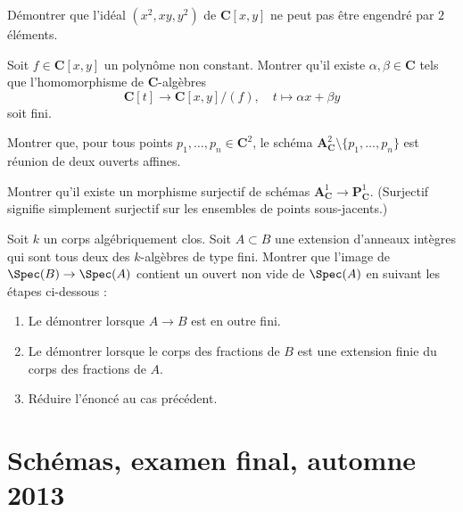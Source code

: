 \begin{exercise}
\label{exercise-not-complete-intersection}
Démontrer que l'idéal $(x^2, xy, y^2)$ de $\mathbf{C}[x, y]$
ne peut pas être engendré par $2$ éléments.
\end{exercise}

\begin{exercise}
\label{exercise-finite-projection}
Soit $f \in \mathbf{C}[x, y]$ un polynôme non constant.
Montrer qu'il existe $\alpha, \beta \in \mathbf{C}$ tels que
l'homomorphisme de $\mathbf{C}$-algèbres
$$
\mathbf{C}[t] \longrightarrow \mathbf{C}[x, y]/(f),\quad
t \longmapsto \alpha x + \beta y
$$
soit fini.
\end{exercise}

\begin{exercise}
\label{exercise-union-of-two-affines}
Montrer que, pour tous points $p_1, \ldots, p_n \in \mathbf{C}^2$,
le schéma $\mathbf{A}^2_\mathbf{C} \setminus \{p_1, \ldots, p_n\}$
est réunion de deux ouverts affines.
\end{exercise}

\begin{exercise}
\label{exercise-surjection-A1-P1}
Montrer qu'il existe un morphisme surjectif de schémas
$\mathbf{A}^1_\mathbf{C} \to \mathbf{P}^1_\mathbf{C}$.
(Surjectif signifie simplement surjectif sur les ensembles de points sous-jacents.)
\end{exercise}

\begin{exercise}
\label{exercise-almost-surjective}
Soit $k$ un corps algébriquement clos. Soit $A \subset B$ une extension
d'anneaux intègres qui sont tous deux des $k$-algèbres de type fini.
Montrer que l'image de $\Spec(B) \to \Spec(A)$
contient un ouvert non vide de $\Spec(A)$ en suivant les étapes ci-dessous :
\begin{enumerate}
\item Le démontrer lorsque $A \to B$ est en outre fini.
\item Le démontrer lorsque le corps des fractions de $B$ est une extension finie
du corps des fractions de $A$.
\item Réduire l'énoncé au cas précédent.
\end{enumerate}
\end{exercise}





\section{Schémas, examen final, automne 2013}
\label{section-final-exam-fall-2013}

